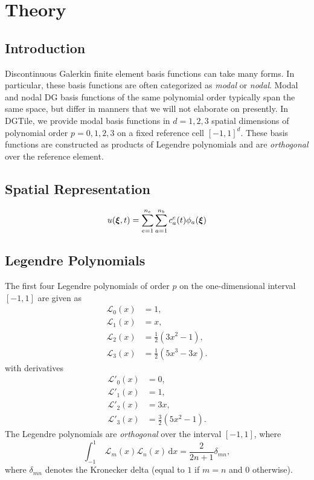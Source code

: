 \section{Theory}

\subsection{Introduction}

Discontinuous Galerkin finite element basis functions can take many forms.
In particular, these basis functions are often categorized as \emph{modal}
or \emph{nodal}. Modal and nodal DG basis functions of the same polynomial
order typically span the same space, but differ in manners that we will not
elaborate on presently. In DGTile, we provide modal basis functions in
$d=1,2,3$ spatial dimensions of polynomial order $p=0,1,2,3$ on a fixed
reference cell $[-1,1]^d$. These basis functions are constructed as products
of Legendre polynomials and are \emph{orthogonal} over the reference element.

\subsection{Spatial Representation}

\begin{equation}
u(\boldsymbol{\xi}, t) = \sum_{e=1}^{n_e} \sum_{a=1}^{n_b} c_a^e(t) \phi_a(\boldsymbol{\xi})
\end{equation}

\subsection{Legendre Polynomials}

The first four Legendre polynomials of order $p$ on the one-dimensional
interval $[-1,1]$ are given as
%
\begin{equation}
\begin{aligned}
\mathcal{L}_0(x) &= 1, \\
\mathcal{L}_1(x) &= x, \\
\mathcal{L}_2(x) &= \frac12 (3x^2-1), \\
\mathcal{L}_3(x) &= \frac12 (5x^3-3x).
\end{aligned}
\label{eq:legendre_polynomials}
\end{equation}
%
with derivatives
%
\begin{equation}
\begin{aligned}
\mathcal{L}'_0(x) &= 0, \\
\mathcal{L}'_1(x) &= 1, \\
\mathcal{L}'_2(x) &= 3x, \\
\mathcal{L}'_3(x) &= \frac32(5x^2-1).
\end{aligned}
\label{eq:legendre_polynomial_derivatives}
\end{equation}
%
The Legendre polynomials are \emph{orthogonal} over the interval $[-1,1]$,
where
%
\begin{equation}
\int_{-1}^1 \; \mathcal{L}_m(x) \mathcal{L}_n(x) \, \text{d}x =
\frac{2}{2n + 1} \delta_{mn},
\end{equation}
%
where $\delta_{mn}$ denotes the Kronecker delta (equal to $1$ if $m=n$ and
$0$ otherwise).

